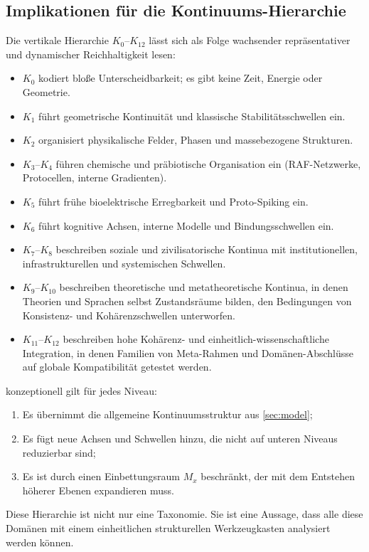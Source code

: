 \subsection{Implikationen für die Kontinuums-Hierarchie}

Die vertikale Hierarchie \(K_0\)–\(K_{12}\) lässt sich als Folge wachsender
repräsentativer und dynamischer Reichhaltigkeit lesen:

\begin{itemize}
    \item \(K_0\) kodiert bloße Unterscheidbarkeit; es gibt keine Zeit,
          Energie oder Geometrie.
    \item \(K_1\) führt geometrische Kontinuität und klassische
          Stabilitätsschwellen ein.
    \item \(K_2\) organisiert physikalische Felder, Phasen und massebezogene
          Strukturen.
    \item \(K_3\)–\(K_4\) führen chemische und präbiotische Organisation ein
          (RAF-Netzwerke, Protocellen, interne Gradienten).
    \item \(K_5\) führt frühe bioelektrische Erregbarkeit und Proto-Spiking ein.
    \item \(K_6\) führt kognitive Achsen, interne Modelle und Bindungsschwellen ein.
    \item \(K_7\)–\(K_8\) beschreiben soziale und zivilisatorische
          Kontinua mit institutionellen, infrastrukturellen und systemischen
          Schwellen.
    \item \(K_9\)–\(K_{10}\) beschreiben theoretische und metatheoretische
          Kontinua, in denen Theorien und Sprachen selbst Zustandsräume bilden,
den Bedingungen von Konsistenz- und Kohärenzschwellen unterworfen.
    \item \(K_{11}\)–\(K_{12}\) beschreiben hohe Kohärenz- und
          einheitlich-wissenschaftliche Integration, in denen Familien von
          Meta-Rahmen und Domänen-Abschlüsse auf globale Kompatibilität
          getestet werden.
\end{itemize}

konzeptionell gilt für jedes Niveau:
\begin{enumerate}
    \item Es übernimmt die allgemeine Kontinuumsstruktur aus \cref{sec:model};
    \item Es fügt neue Achsen und Schwellen hinzu, die nicht auf unteren Niveaus
          reduzierbar sind;
    \item Es ist durch einen Einbettungsraum \(M_x\) beschränkt, der mit dem
          Entstehen höherer Ebenen expandieren muss.
\end{enumerate}
Diese Hierarchie ist nicht nur eine Taxonomie.
Sie ist eine Aussage, dass alle diese Domänen mit einem einheitlichen
strukturellen Werkzeugkasten analysiert werden können.

